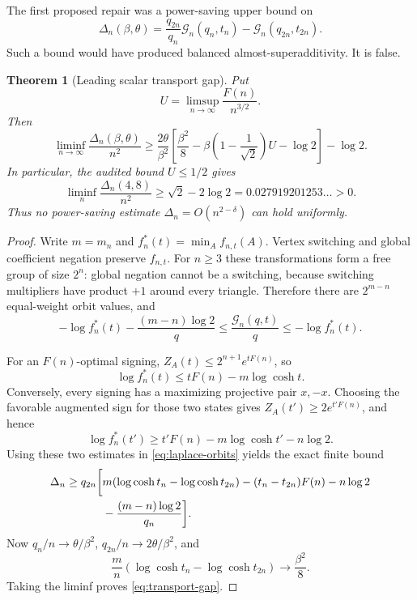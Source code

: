 \documentclass[11pt]{article}
\newtheorem{theorem}{Theorem}
\begin{document}
The first proposed repair was a power-saving upper bound on
\[
 \Delta_n(\beta,\theta)
 =\frac{q_{2n}}{q_n}\mathcal G_n(q_n,t_n)
 -\mathcal G_n(q_{2n},t_{2n}).
 \tag{PT-defect}
\]
Such a bound would have produced balanced almost-superadditivity.  It is
false.

\begin{theorem}[Leading scalar transport gap]
\label{thm:transport-gap}
Put
\[
 U=\limsup_{n\to\infty}\frac{F(n)}{n^{3/2}}.
\]
Then
\begin{equation}
 \liminf_{n\to\infty}\frac{\Delta_n(\beta,\theta)}{n^2}
 \ge
 \frac{2\theta}{\beta^2}
 \left[\frac{\beta^2}{8}
 -\beta\left(1-\frac1{\sqrt2}\right)U-\log2\right]-\log2.
 \label{eq:transport-gap}
\end{equation}
In particular, the audited bound $U\le1/2$ gives
\[
 \liminf_n\frac{\Delta_n(4,8)}{n^2}
 \ge\sqrt2-2\log2=0.027919201253\ldots>0.
\]
Thus no power-saving estimate $\Delta_n=O(n^{2-\delta})$ can hold uniformly.
\end{theorem}

\begin{proof}
Write $m=m_n$ and $f_n^*(t)=\min_A f_{n,t}(A)$.  Vertex switching and global
coefficient negation preserve $f_{n,t}$.  For $n\ge3$ these transformations
form a free group of size $2^n$: global negation cannot be a switching,
because switching multipliers have product $+1$ around every triangle.
Therefore there are $2^{m-n}$ equal-weight orbit values, and
\begin{equation}
 -\log f_n^*(t)-\frac{(m-n)\log2}{q}
 \le\frac{\mathcal G_n(q,t)}q
 \le-\log f_n^*(t).
 \label{eq:laplace-orbits}
\end{equation}

For an $F(n)$-optimal signing,
$Z_A(t)\le2^{n+1}e^{tF(n)}$, so
\[
 \log f_n^*(t)\le tF(n)-m\log\cosh t.
\]
Conversely, every signing has a maximizing projective pair $x,-x$.  Choosing
the favorable augmented sign for those two states gives
$Z_A(t')\ge2e^{t'F(n)}$, and hence
\[
 \log f_n^*(t')\ge t'F(n)-m\log\cosh t'-n\log2.
\]
Using these two estimates in \eqref{eq:laplace-orbits} yields the exact finite
bound
\begin{align}
 \Delta_n\ge q_{2n}\bigg[&
 m(\log\cosh t_n-\log\cosh t_{2n})
 -(t_n-t_{2n})F(n)-n\log2\notag\\
 &-\frac{(m-n)\log2}{q_n}\bigg].
 \label{eq:finite-transport-gap}
\end{align}
Now $q_n/n\to\theta/\beta^2$, $q_{2n}/n\to2\theta/\beta^2$, and
\[
 \frac mn(\log\cosh t_n-\log\cosh t_{2n})
 \longrightarrow\frac{\beta^2}{8}.
\]
Taking the liminf proves \eqref{eq:transport-gap}.
\end{proof}
\end{document}
